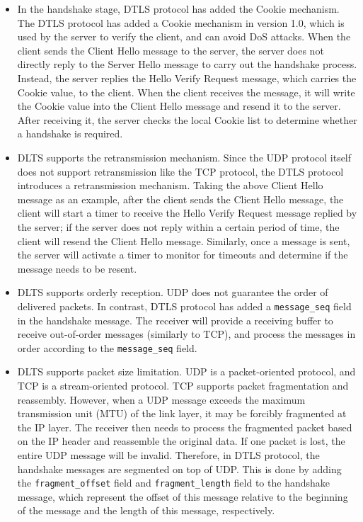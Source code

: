 \documentclass[a4paper,12pt]{book}
\begin{document}
\begin{itemize}[leftmargin=1.5em]
    \item In the handshake stage, DTLS protocol has added the Cookie mechanism. The DTLS protocol has added a Cookie mechanism in version 1.0, which is used by the server to verify the client, and can avoid DoS attacks. When the client sends the Client Hello message to the server, the server does not directly reply to the Server Hello message to carry out the handshake process. Instead, the server replies the Hello Verify Request message, which carries the Cookie value, to the client. When the client receives the message, it will write the Cookie value into the Client Hello message and resend it to the server. After receiving it, the server checks the local Cookie list to determine whether a handshake is required.
    \item DLTS supports the retransmission mechanism. Since the UDP protocol itself does not support retransmission like the TCP protocol, the DTLS protocol introduces a retransmission mechanism. Taking the above Client Hello message as an example, after the client sends the Client Hello message, the client will start a timer to receive the Hello Verify Request message replied by the server; if the server does not reply within a certain period of time, the client will resend the Client Hello message. Similarly, once a message is sent, the server will activate a timer to monitor for timeouts and determine if the message needs to be resent.
    \item DLTS supports orderly reception. UDP does not guarantee the order of delivered packets. In contrast, DTLS protocol has added a \verb|message_seq| field in the handshake message. The receiver will provide a receiving buffer to receive out-of-order messages (similarly to TCP), and process the messages in order according to the \verb|message_seq| field.
    \item DLTS supports packet size limitation. UDP is a packet-oriented protocol, and TCP is a stream-oriented protocol. TCP supports packet fragmentation and reassembly. However, when a UDP message exceeds the maximum transmission unit (MTU) of the link layer, it may be forcibly fragmented at the IP layer. The receiver then needs to process the fragmented packet based on the IP header and reassemble the original data. If one packet is lost, the entire UDP message will be invalid. Therefore, in DTLS protocol, the handshake messages are segmented on top of UDP. This is done by adding the \verb|fragment_offset| field and \verb|fragment_length| field to the handshake message, which represent the offset of this message relative to the beginning of the message and the length of this message, respectively. 
\end{itemize}
\end{document}
